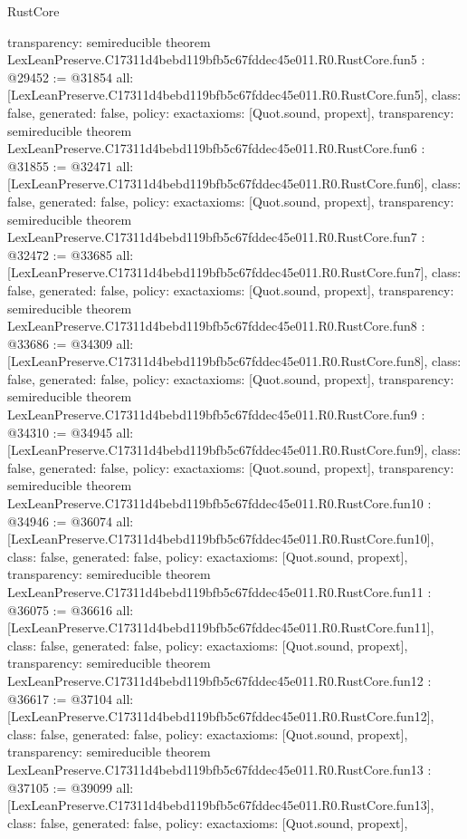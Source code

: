 \begin{lexlean}{RustCore}
\begin{coremodule}
{  transparency: semireducible
}
theorem LexLeanPreserve.C17311d4bebd119bfb5c67fddec45e011.R0.RustCore.fun5 : @29452 := @31854 {
  all: [LexLeanPreserve.C17311d4bebd119bfb5c67fddec45e011.R0.RustCore.fun5],
  class: false,
  generated: false,
  policy: exact{axioms: [Quot.sound, propext]},
  transparency: semireducible
}
theorem LexLeanPreserve.C17311d4bebd119bfb5c67fddec45e011.R0.RustCore.fun6 : @31855 := @32471 {
  all: [LexLeanPreserve.C17311d4bebd119bfb5c67fddec45e011.R0.RustCore.fun6],
  class: false,
  generated: false,
  policy: exact{axioms: [Quot.sound, propext]},
  transparency: semireducible
}
theorem LexLeanPreserve.C17311d4bebd119bfb5c67fddec45e011.R0.RustCore.fun7 : @32472 := @33685 {
  all: [LexLeanPreserve.C17311d4bebd119bfb5c67fddec45e011.R0.RustCore.fun7],
  class: false,
  generated: false,
  policy: exact{axioms: [Quot.sound, propext]},
  transparency: semireducible
}
theorem LexLeanPreserve.C17311d4bebd119bfb5c67fddec45e011.R0.RustCore.fun8 : @33686 := @34309 {
  all: [LexLeanPreserve.C17311d4bebd119bfb5c67fddec45e011.R0.RustCore.fun8],
  class: false,
  generated: false,
  policy: exact{axioms: [Quot.sound, propext]},
  transparency: semireducible
}
theorem LexLeanPreserve.C17311d4bebd119bfb5c67fddec45e011.R0.RustCore.fun9 : @34310 := @34945 {
  all: [LexLeanPreserve.C17311d4bebd119bfb5c67fddec45e011.R0.RustCore.fun9],
  class: false,
  generated: false,
  policy: exact{axioms: [Quot.sound, propext]},
  transparency: semireducible
}
theorem LexLeanPreserve.C17311d4bebd119bfb5c67fddec45e011.R0.RustCore.fun10 : @34946 := @36074 {
  all: [LexLeanPreserve.C17311d4bebd119bfb5c67fddec45e011.R0.RustCore.fun10],
  class: false,
  generated: false,
  policy: exact{axioms: [Quot.sound, propext]},
  transparency: semireducible
}
theorem LexLeanPreserve.C17311d4bebd119bfb5c67fddec45e011.R0.RustCore.fun11 : @36075 := @36616 {
  all: [LexLeanPreserve.C17311d4bebd119bfb5c67fddec45e011.R0.RustCore.fun11],
  class: false,
  generated: false,
  policy: exact{axioms: [Quot.sound, propext]},
  transparency: semireducible
}
theorem LexLeanPreserve.C17311d4bebd119bfb5c67fddec45e011.R0.RustCore.fun12 : @36617 := @37104 {
  all: [LexLeanPreserve.C17311d4bebd119bfb5c67fddec45e011.R0.RustCore.fun12],
  class: false,
  generated: false,
  policy: exact{axioms: [Quot.sound, propext]},
  transparency: semireducible
}
theorem LexLeanPreserve.C17311d4bebd119bfb5c67fddec45e011.R0.RustCore.fun13 : @37105 := @39099 {
  all: [LexLeanPreserve.C17311d4bebd119bfb5c67fddec45e011.R0.RustCore.fun13],
  class: false,
  generated: false,
  policy: exact{axioms: [Quot.sound, propext]},
}
\end{coremodule}
\end{lexlean}

